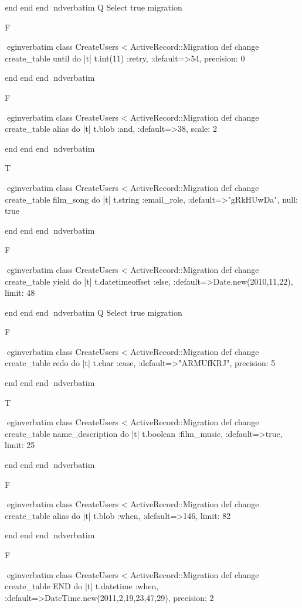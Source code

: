     end 
  end 
end
nd{verbatim}
Q
 Select true migration

F

egin{verbatim}
 class CreateUsers < ActiveRecord::Migration 
  def change 
    create_table until do |t| 
      t.int(11) :retry, :default=>54, precision: 0
    
    end 
  end 
end
nd{verbatim}

F

egin{verbatim}
 class CreateUsers < ActiveRecord::Migration 
  def change 
    create_table alias do |t| 
      t.blob :and, :default=>38, scale: 2
    
    end 
  end 
end
nd{verbatim}

T

egin{verbatim}
 class CreateUsers < ActiveRecord::Migration 
  def change 
    create_table film_song do |t| 
      t.string :email_role, :default=>"gRkHUwDa", null: true
    
    end 
  end 
end
nd{verbatim}

F

egin{verbatim}
 class CreateUsers < ActiveRecord::Migration 
  def change 
    create_table yield do |t| 
      t.datetimeoffset :else, :default=>Date.new(2010,11,22), limit: 48
    
    end 
  end 
end
nd{verbatim}
Q
 Select true migration

F

egin{verbatim}
 class CreateUsers < ActiveRecord::Migration 
  def change 
    create_table redo do |t| 
      t.char :case, :default=>"ARMUfKRJ", precision: 5
    
    end 
  end 
end
nd{verbatim}

T

egin{verbatim}
 class CreateUsers < ActiveRecord::Migration 
  def change 
    create_table name_description do |t| 
      t.boolean :film_music, :default=>true, limit: 25
    
    end 
  end 
end
nd{verbatim}

F

egin{verbatim}
 class CreateUsers < ActiveRecord::Migration 
  def change 
    create_table alias do |t| 
      t.blob :when, :default=>146, limit: 82
    
    end 
  end 
end
nd{verbatim}

F

egin{verbatim}
 class CreateUsers < ActiveRecord::Migration 
  def change 
    create_table END do |t| 
      t.datetime :when, :default=>DateTime.new(2011,2,19,23,47,29), precision: 2
    

